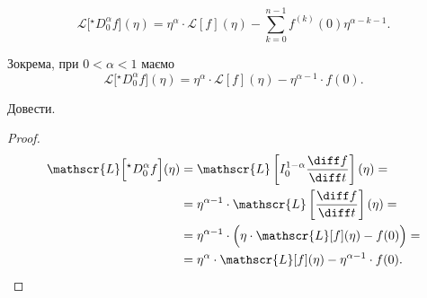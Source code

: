 \begin{lemma}
    \begin{equation}
        \mathscr{L}\Big[{}^\star D_0^\alpha f\Big](\eta) = \eta^{\alpha} \cdot \mathscr{L}[f](\eta) - \sum_{k = 0}^{n - 1} f^{(k)}(0) \eta^{\alpha - k - 1}.
    \end{equation}
\end{lemma}
\begin{example}
    Зокрема, при $0 < \alpha < 1$ маємо
    \begin{equation}
        \mathscr{L}\Big[{}^\star D_0^\alpha f\Big](\eta) = \eta^{\alpha} \cdot \mathscr{L}[f](\eta) - \eta^{\alpha - 1} \cdot f(0).
    \end{equation}
\end{example}
\begin{exercise}
    Довести.
\end{exercise}
\begin{proof}
    \begin{equation}
        \begin{aligned}
            \mathscr{L}\Big[{}^\star D_0^\alpha f\Big](\eta) &= \mathscr{L} \left[I_0^{1 - \alpha} \frac{\diff f}{\diff t} \right](\eta) = \\
            &= \eta^{\alpha - 1} \cdot \mathscr{L} \left[\frac{\diff f}{\diff t} \right](\eta) = \\
            &= \eta^{\alpha - 1} \cdot \Big(\eta \cdot \mathscr{L}[f](\eta) - f(0) \Big) = \\
            &= \eta^{\alpha} \cdot \mathscr{L}[f](\eta) - \eta^{\alpha - 1} \cdot f(0).
        \end{aligned}
    \end{equation}
\end{proof}